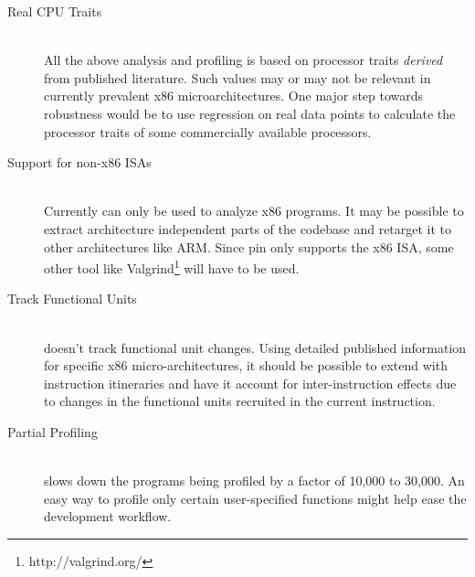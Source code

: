 \begin{description}
\item[Real CPU Traits] \hfill \\ All the above analysis and profiling
  is based on processor traits \textit{derived} from published
  literature.  Such values may or may not be relevant in currently
  prevalent x86 microarchitectures.  One major step towards robustness
  would be to use regression on real data points to calculate the
  processor traits of some commercially available processors.

\item[Support for non-x86 ISAs] \hfill \\ Currently \wattage can only
  be used to analyze x86 programs.  It may be possible to extract
  architecture independent parts of the codebase and retarget it to
  other architectures like ARM.  Since pin only supports the x86 ISA,
  some other tool like Valgrind\footnote{http://valgrind.org/} will
  have to be used.

\item[Track Functional Units] \hfill \\ \wattage doesn't track
  functional unit changes.  Using detailed published information for
  specific x86 micro-architectures, it should be possible to extend
  \wattage with instruction itineraries and have it account for
  inter-instruction effects due to changes in the functional units
  recruited in the current instruction.

\item[Partial Profiling] \hfill \\ \wattage slows down the programs
  being profiled by a factor of 10,000 to 30,000.  An easy way to
  profile only certain user-specified functions might help ease the
  development workflow.
\end{description}
